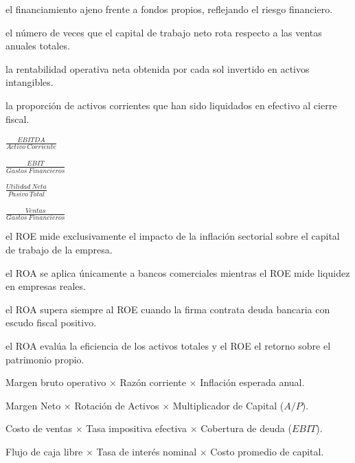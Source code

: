 \begin{opts}
    \item el financiamiento ajeno frente a fondos propios, reflejando el riesgo financiero.
    \item el número de veces que el capital de trabajo neto rota respecto a las ventas anuales totales.
    \item la rentabilidad operativa neta obtenida por cada sol invertido en activos intangibles.
    \item la proporción de activos corrientes que han sido liquidados en efectivo al cierre fiscal.
\end{opts}

\begin{opts}
    \item $\frac{EBITDA}{Activo\ Corriente}$
    \item $\frac{EBIT}{Gastos\ Financieros}$
    \item $\frac{Utilidad\ Neta}{Pasivo\ Total}$
    \item $\frac{Ventas}{Gastos\ Financieros}$
\end{opts}

\begin{opts}
    \item el ROE mide exclusivamente el impacto de la inflación sectorial sobre el capital de trabajo de la empresa.
    \item el ROA se aplica únicamente a bancos comerciales mientras el ROE mide liquidez en empresas reales.
    \item el ROA supera siempre al ROE cuando la firma contrata deuda bancaria con escudo fiscal positivo.
    \item el ROA evalúa la eficiencia de los activos totales y el ROE el retorno sobre el patrimonio propio.
\end{opts}

\begin{opts}
    \item Margen bruto operativo $\times$ Razón corriente $\times$ Inflación esperada anual.
    \item Margen Neto $\times$ Rotación de Activos $\times$ Multiplicador de Capital ($A/P$).
    \item Costo de ventas $\times$ Tasa impositiva efectiva $\times$ Cobertura de deuda ($EBIT$).
    \item Flujo de caja libre $\times$ Tasa de interés nominal $\times$ Costo promedio de capital.
\end{opts}

